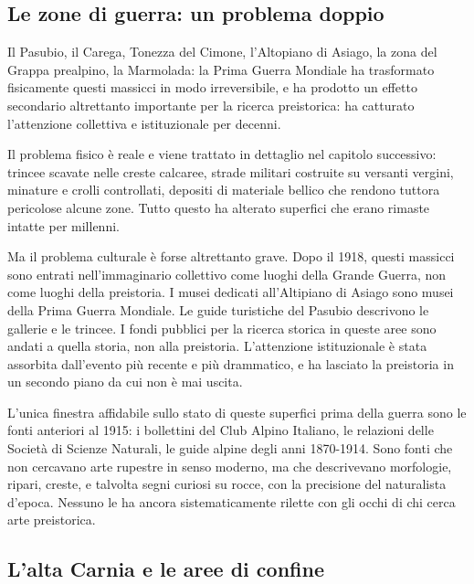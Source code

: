 \subsection{Le zone di guerra: un problema doppio}

Il Pasubio, il Carega, Tonezza del Cimone, l'Altopiano di Asiago, la zona del Grappa prealpino, la Marmolada: la Prima Guerra Mondiale ha trasformato fisicamente questi massicci in modo irreversibile, e ha prodotto un effetto secondario altrettanto importante per la ricerca preistorica: ha catturato l'attenzione collettiva e istituzionale per decenni.

Il problema fisico è reale e viene trattato in dettaglio nel capitolo successivo: trincee scavate nelle creste calcaree, strade militari costruite su versanti vergini, minature e crolli controllati, depositi di materiale bellico che rendono tuttora pericolose alcune zone. Tutto questo ha alterato superfici che erano rimaste intatte per millenni.

Ma il problema culturale è forse altrettanto grave. Dopo il 1918, questi massicci sono entrati nell'immaginario collettivo come luoghi della Grande Guerra, non come luoghi della preistoria. I musei dedicati all'Altipiano di Asiago sono musei della Prima Guerra Mondiale. Le guide turistiche del Pasubio descrivono le gallerie e le trincee. I fondi pubblici per la ricerca storica in queste aree sono andati a quella storia, non alla preistoria. L'attenzione istituzionale è stata assorbita dall'evento più recente e più drammatico, e ha lasciato la preistoria in un secondo piano da cui non è mai uscita.

L'unica finestra affidabile sullo stato di queste superfici prima della guerra sono le fonti anteriori al 1915: i bollettini del Club Alpino Italiano, le relazioni delle Società di Scienze Naturali, le guide alpine degli anni 1870-1914. Sono fonti che non cercavano arte rupestre in senso moderno, ma che descrivevano morfologie, ripari, creste, e talvolta segni curiosi su rocce, con la precisione del naturalista d'epoca. Nessuno le ha ancora sistematicamente rilette con gli occhi di chi cerca arte preistorica.

\subsection{L'alta Carnia e le aree di confine}

